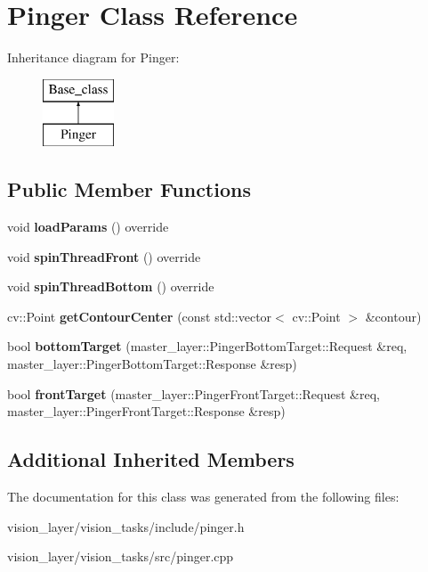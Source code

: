 \hypertarget{classPinger}{}\section{Pinger Class Reference}
\label{classPinger}
Inheritance diagram for Pinger\+:\begin{figure}[H]
\begin{center}
\leavevmode
\includegraphics[height=2.000000cm]{classPinger}
\end{center}
\end{figure}
\subsection*{Public Member Functions}
\begin{DoxyCompactItemize}
\item 
\mbox{\label{classPinger_ae278a0225ba745088e5b50e2d6f5fd9a}} 
void {\bfseries load\+Params} () override
\item 
\mbox{\label{classPinger_a7aa53b5cbb26629489f8496423b5545b}} 
void {\bfseries spin\+Thread\+Front} () override
\item 
\mbox{\label{classPinger_a7c97db853b58ae6820d035cf725c7ef5}} 
void {\bfseries spin\+Thread\+Bottom} () override
\item 
\mbox{\label{classPinger_ac45be62a1492fa5f8edbbed7aab4e7d3}} 
cv\+::\+Point {\bfseries get\+Contour\+Center} (const std\+::vector$<$ cv\+::\+Point $>$ \&contour)
\item 
\mbox{\label{classPinger_a7de00bb1fc39dcccf9c7e7fc05f19614}} 
bool {\bfseries bottom\+Target} (master\+\_\+layer\+::\+Pinger\+Bottom\+Target\+::\+Request \&req, master\+\_\+layer\+::\+Pinger\+Bottom\+Target\+::\+Response \&resp)
\item 
\mbox{\label{classPinger_aa6b09770f9406dca2287a7299e76df5f}} 
bool {\bfseries front\+Target} (master\+\_\+layer\+::\+Pinger\+Front\+Target\+::\+Request \&req, master\+\_\+layer\+::\+Pinger\+Front\+Target\+::\+Response \&resp)
\end{DoxyCompactItemize}
\subsection*{Additional Inherited Members}


The documentation for this class was generated from the following files\+:\begin{DoxyCompactItemize}
\item 
vision\+\_\+layer/vision\+\_\+tasks/include/pinger.\+h\item 
vision\+\_\+layer/vision\+\_\+tasks/src/pinger.\+cpp\end{DoxyCompactItemize}
